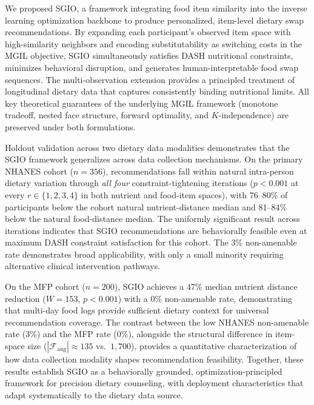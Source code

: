 \documentclass[journal]{IEEEtran}
\newcommand{\Faug}{\mathcal{F}_{\mathrm{aug}}}
\begin{document}
We proposed SGIO, a framework integrating food item similarity into the
inverse learning optimization backbone to produce personalized,
item-level dietary swap recommendations. By expanding each participant's
observed item space with high-similarity neighbors and encoding
substitutability as switching costs in the MGIL objective, SGIO
simultaneously satisfies DASH nutritional constraints, minimizes
behavioral disruption, and generates human-interpretable food swap
sequences. The multi-observation extension provides a principled
treatment of longitudinal dietary data that captures consistently binding
nutritional limits. All key theoretical guarantees of the underlying MGIL
framework (monotone tradeoff, nested face structure, forward optimality,
and $K$-independence) are preserved under both formulations.

Holdout validation across two dietary data modalities demonstrates that
the SGIO framework generalizes across data collection mechanisms. On the
primary NHANES cohort ($n{=}356$), recommendations fall within natural
intra-person dietary variation through \emph{all four}
constraint-tightening iterations ($p{<}0.001$ at every $r \in \{1,2,3,4\}$
in both nutrient and food-item spaces), with 76--80\% of participants
below the cohort natural nutrient-distance median and 81--84\% below the
natural food-distance median. The uniformly significant result across
iterations indicates that SGIO recommendations are behaviorally feasible
even at maximum DASH constraint satisfaction for this cohort. The 3\%
non-amenable rate demonstrates broad applicability, with only a small
minority requiring alternative clinical intervention pathways.

On the MFP cohort ($n{=}200$), SGIO achieves a 47\% median nutrient
distance reduction ($W{=}153$, $p{<}0.001$) with a 0\% non-amenable
rate, demonstrating that multi-day food logs provide sufficient dietary
context for universal recommendation coverage. The contrast between the
low NHANES non-amenable rate (3\%) and the MFP rate (0\%), alongside the
structural difference in item-space size ($|\Faug| \approx 135$ vs.\
$1{,}700$), provides a quantitative characterization of how data
collection modality shapes recommendation feasibility. Together, these
results establish SGIO as a behaviorally grounded, optimization-principled
framework for precision dietary counseling, with deployment
characteristics that adapt systematically to the dietary data source.
\end{document}
